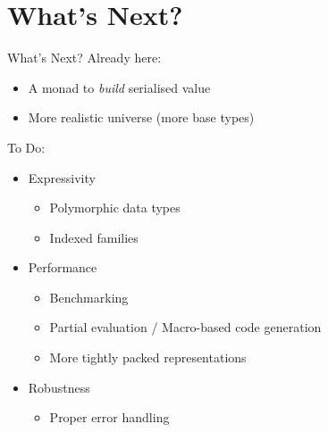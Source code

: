 
\section{What's Next?}

\begin{frame}{What's Next?}
Already here:
\begin{itemize}
  \item A monad to \emph{build} serialised value
  \item More realistic universe (more base types)
\end{itemize}
\bigskip
To Do:
\begin{itemize}
  \item Expressivity
  \begin{itemize}
    \item Polymorphic data types
    \item Indexed families
  \end{itemize}

  \item Performance
  \begin{itemize}
    \item Benchmarking
    \item Partial evaluation / Macro-based code generation
    \item More tightly packed representations
  \end{itemize}

  \item Robustness
  \begin{itemize}
    \item Proper error handling
  \end{itemize}
\end{itemize}
\end{frame}
